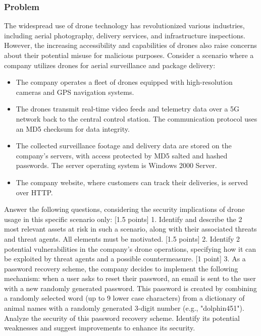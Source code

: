 \documentclass{article}
\begin{document}
\subsubsection*{Problem}
The widespread use of drone technology has revolutionized various industries, including aerial photography, delivery services, and infrastructure inspections. However, the increasing accessibility and capabilities of drones also raise concerns about their potential misuse for malicious purposes. Consider a scenario where a company utilizes drones for aerial surveillance and package delivery:
\begin{itemize}
    \item The company operates a fleet of drones equipped with high-resolution cameras and GPS navigation systems.
    \item The drones transmit real-time video feeds and telemetry data over a 5G network back to the central control station. The communication protocol uses an MD5 checksum for data integrity.
    \item The collected surveillance footage and delivery data are stored on the company's servers, with access protected by MD5 salted and hashed passwords. The server operating system is Windows 2000 Server.
    \item The company website, where customers can track their deliveries, is served over HTTP.

\end{itemize}
Answer the following questions, considering the security implications of drone usage in this specific scenario only:
[1.5 points] 1. Identify and describe the 2 most relevant assets at risk in such a scenario, along with their associated threats and threat agents. All elements must be motivated.
[1.5 points] 2. Identify 2 potential vulnerabilities in the company's drone operations, specifying how it can be exploited by threat agents and a possible countermeasure.
[1 point] 3. As a password recovery scheme, the company decides to implement the following mechanism: when a user asks to reset their password, an email is sent to the user with a new randomly generated password. This password is created by combining a randomly selected word (up to 9 lower case characters) from a dictionary of animal names with a randomly generated 3-digit number (e.g., "dolphin451"). Analyze the security of this password recovery scheme. Identify its potential weaknesses and suggest improvements to enhance its security.
\end{document}
